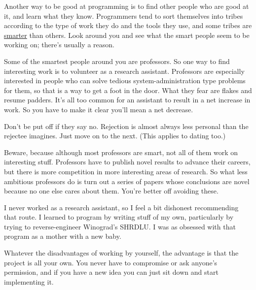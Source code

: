 Another way to be good at programming
                    is to find other people who are good at it, and learn what
                    they know. Programmers tend to sort themselves into tribes
                    according to the type of work they do and the tools they
                    use, and some tribes are
                    \href{http://www.paulgraham.com/pypar.html}{smarter} than others. Look around
                    you and see what the smart people seem to be working on;
                    there's usually a reason.

Some of the smartest
                    people around you are professors. So one way to find
                    interesting work is to volunteer as a research assistant.
                    Professors are especially interested in people who can solve
                    tedious system-administration type problems for them, so
                    that is a way to get a foot in the door. What they fear are
                    flakes and resume padders. It's all too common for an
                    assistant to result in a net increase in work. So you have
                    to make it clear you'll mean a net decrease.

Don't
                    be put off if they say no. Rejection is almost always less
                    personal than the rejectee imagines. Just move on to the
                    next. (This applies to dating too.)

Beware,
                    because although most professors are smart, not all of them
                    work on interesting stuff. Professors have to publish novel
                    results to advance their careers, but there is more
                    competition in more interesting areas of research. So what
                    less ambitious professors do is turn out a series of papers
                    whose conclusions are novel because no one else cares about
                    them. You're better off avoiding these.

I never
                    worked as a research assistant, so I feel a bit dishonest
                    recommending that route. I learned to program by writing
                    stuff of my own, particularly by trying to reverse-engineer
                    Winograd's SHRDLU. I was as obsessed with that program as a
                    mother with a new baby.

Whatever the
                    disadvantages of working by yourself, the advantage is that
                    the project is all your own. You never have to compromise or
                    ask anyone's permission, and if you have a new idea you can
                    just sit down and start implementing it.

